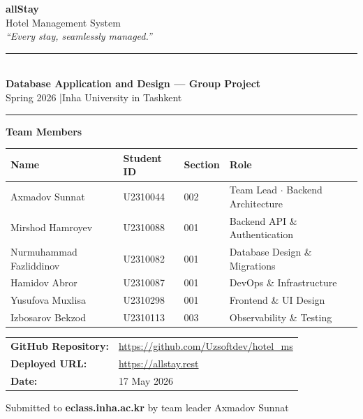 \documentclass[12pt,a4paper]{article}
\begin{document}
\thispagestyle{empty}

\begin{titlepage}
\centering
\vspace*{1.2cm}

{\Huge\bfseries\color{accent} allStay}\\[0.4em]
{\Large Hotel Management System}\\[0.25em]
{\normalsize\itshape\color{darkgray} ``Every stay, seamlessly managed.''}

\vspace{1.6cm}
\rule{\linewidth}{1pt}\\[0.4em]
{\large\bfseries Database Application and Design --- Group Project}\\
{\normalsize Spring 2026 \quad|\quad Inha University in Tashkent}\\[0.4em]
\rule{\linewidth}{0.4pt}

\vspace{1.8cm}
{\large\bfseries Team Members}

\vspace{0.6em}
\begin{tabular}{@{}llll@{}}
\toprule
\textbf{Name} & \textbf{Student ID} & \textbf{Section} & \textbf{Role} \\
\midrule
Axmadov Sunnat          & U2310044 & 002 & Team Lead $\cdot$ Backend Architecture \\
Mirshod Hamroyev        & U2310088 & 001 & Backend API \& Authentication \\
Nurmuhammad Fazliddinov & U2310082 & 001 & Database Design \& Migrations \\
Hamidov Abror           & U2310087 & 001 & DevOps \& Infrastructure \\
Yusufova Muxlisa        & U2310298 & 001 & Frontend \& UI Design \\
Izbosarov Bekzod        & U2310113 & 003 & Observability \& Testing \\
\bottomrule
\end{tabular}

\vspace{1.8cm}
\begin{tabular}{@{}ll@{}}
\textbf{GitHub Repository:} & \url{https://github.com/Uzsoftdev/hotel_ms} \\[0.4em]
\textbf{Deployed URL:}       & \url{https://allstay.rest} \\[0.4em]
\textbf{Date:}               & 17 May 2026 \\
\end{tabular}

\vfill
{\small Submitted to \textbf{eclass.inha.ac.kr} by team leader Axmadov Sunnat}
\end{titlepage}
\end{document}

